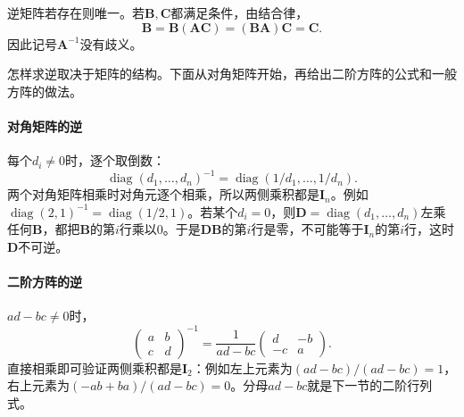 逆矩阵若存在则唯一。若$\bm B,\bm C$都满足条件，由结合律，
\[
 \bm B=\bm B(\bm A\bm C)=(\bm B\bm A)\bm C=\bm C.
\]
因此记号$\bm A^{-1}$没有歧义。

怎样求逆取决于矩阵的结构。下面从对角矩阵开始，再给出二阶方阵的公式和一般方阵的做法。

\paragraph{对角矩阵的逆}
每个$d_i\neq0$时，逐个取倒数：
\[
 \operatorname{diag}(d_1,\ldots,d_n)^{-1}=\operatorname{diag}(1/d_1,\ldots,1/d_n).
\]
两个对角矩阵相乘时对角元逐个相乘，所以两侧乘积都是$\bm I_n$。例如$\operatorname{diag}(2,1)^{-1}=\operatorname{diag}(1/2,1)$。若某个$d_i=0$，则$\bm D=\operatorname{diag}(d_1,\ldots,d_n)$左乘任何$\bm B$，都把$\bm B$的第$i$行乘以$0$。于是$\bm D\bm B$的第$i$行是零，不可能等于$\bm I_n$的第$i$行，这时$\bm D$不可逆。

\paragraph{二阶方阵的逆}
$ad-bc\neq0$时，
\[
 \begin{pmatrix}a&b\\c&d\end{pmatrix}^{-1}=\frac1{ad-bc}\begin{pmatrix}d&-b\\-c&a\end{pmatrix}.
\]
直接相乘即可验证两侧乘积都是$\bm I_2$：例如左上元素为$(ad-bc)/(ad-bc)=1$，右上元素为$(-ab+ba)/(ad-bc)=0$。分母$ad-bc$就是下一节的二阶行列式。

